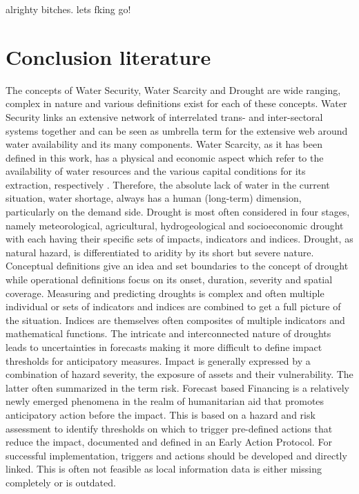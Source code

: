 
alrighty bitches. lets fking go!


\section{Conclusion literature}

The concepts of Water Security, Water Scarcity and Drought are wide ranging, complex in nature and various definitions exist for each of these concepts. Water Security links an extensive network of interrelated trans- and inter-sectoral systems together and can be seen as umbrella term for the extensive web around water availability and its many components. Water Scarcity, as it has been defined in this work, has a physical and economic aspect which refer to the availability of water resources and the various capital conditions for its extraction, respectively \autocite{faoCopingWaterScarcity2012}. Therefore, the absolute lack of water in the current situation, water shortage, always has a human (long-term) dimension, particularly on the demand side. Drought is most often considered in four stages, namely meteorological, agricultural, hydrogeological and socioeconomic drought with each having their specific sets of impacts, indicators and indices. Drought, as natural hazard, is differentiated to aridity by its short but severe nature. Conceptual definitions give an idea and set boundaries to the concept of drought while operational definitions focus on its onset, duration, severity and spatial coverage.
Measuring and predicting droughts is complex and often multiple individual or sets of indicators and indices are combined to get a full picture of the situation. Indices are themselves often composites of multiple indicators and mathematical functions. The intricate and interconnected nature of droughts leads to uncertainties in forecasts making it more difficult to define impact thresholds for anticipatory measures. Impact is generally expressed by a combination of hazard severity, the exposure of assets and their vulnerability. The latter often summarized in the term risk.
Forecast based Financing is a relatively newly emerged phenomena in the realm of humanitarian aid that promotes anticipatory action before the impact. This is based on a hazard and risk assessment to identify thresholds on which to trigger pre-defined actions that reduce the impact, documented and defined in an Early Action Protocol. For successful implementation, triggers and actions should be developed and directly linked. This is often not feasible as local information data is either missing completely or is outdated.
